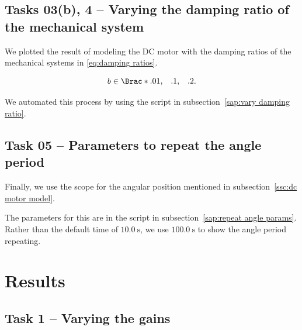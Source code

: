 \documentclass[12pt]{article}
\DeclarePairedDelimiter\Brac\{\}%
\begin{document}
\subsection{Tasks 03(b), 4 -- Varying the damping ratio of the mechanical system}

We plotted the result of modeling the DC motor with the damping ratios of the mechanical systems in \eqref{eq:damping ratios}.

\begin{equation}\label{eq:damping ratios}
    b \in \Brac*{\begin{matrix}.01, & .1, & .2\end{matrix}}.
\end{equation}

We automated this process by using the script in  subsection~\ref{sap:vary damping ratio}.


\subsection{Task 05 -- Parameters to repeat the angle period}

Finally, we use the scope for the angular position mentioned in subsection~\ref{ssc:dc motor model}.

The parameters for this are in the script in  subsection~\ref{sap:repeat angle params}. 
Rather than the default time of $\SI{10.0}\second$,
we use $\SI{100.0}\second$
to show the angle period repeating.

\section{Results}

\subsection{Task 1 -- Varying the gains}
\end{document}
